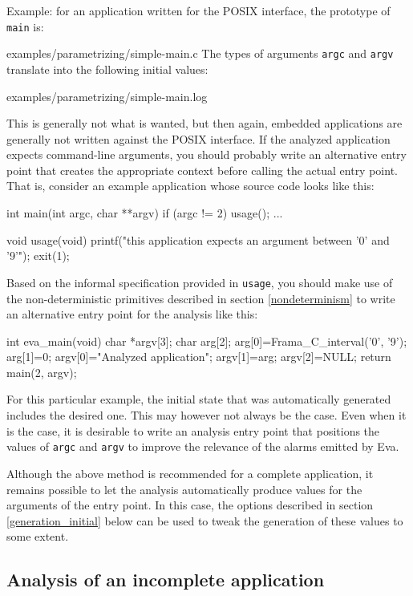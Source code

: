 \documentclass[web]{frama-c-book}
\newcommand{\Eva}{\textsf{Eva}}
\begin{document}
Example: for an application written for the POSIX interface, the
prototype of \lstinline|main| is:

  {examples/parametrizing/simple-main.c}
The types of arguments \lstinline|argc| and \lstinline|argv| 
translate into the following initial values:

  {examples/parametrizing/simple-main.log}

This is generally not what is wanted, but then again, embedded applications
are generally not written against the POSIX interface. If the analyzed
application expects command-line arguments, you should probably
write an alternative entry point that creates the appropriate context
before calling the actual entry point.
That is, consider an example application whose source code looks like this:
\begin{listing-nonumber}
int main(int argc, char **argv)
{
  if (argc != 2) usage();
  ...
}

void usage(void)
{
  printf("this application expects an argument between '0' and '9'\n");
  exit(1);
}
\end{listing-nonumber}

Based on the informal specification provided in \lstinline|usage|,
you should make use of the non-deterministic primitives described in
section \ref{nondeterminism} to write an alternative entry point
for the analysis like this:
\begin{listing-nonumber}
int eva_main(void)
{
  char *argv[3];
  char arg[2];
  arg[0]=Frama_C_interval('0', '9');
  arg[1]=0;
  argv[0]="Analyzed application";
  argv[1]=arg;
  argv[2]=NULL;
  return main(2, argv);
}
\end{listing-nonumber}

For this particular example, the initial state that was
automatically generated includes the desired one. This may however
not always be the case. Even when it is the case, it is desirable
to write an analysis entry point that positions the
values of \lstinline|argc| and \lstinline|argv| to
improve the relevance of the alarms emitted by \Eva{}.

Although the above method is recommended for a complete
application, it remains possible to let the analysis automatically
produce values for the arguments of the entry point. In this
case, the options described in section \ref{generation_initial} below
can be used to tweak the generation of these values to some extent.

\subsection{Analysis of an incomplete application}\label{libentry}
\end{document}
